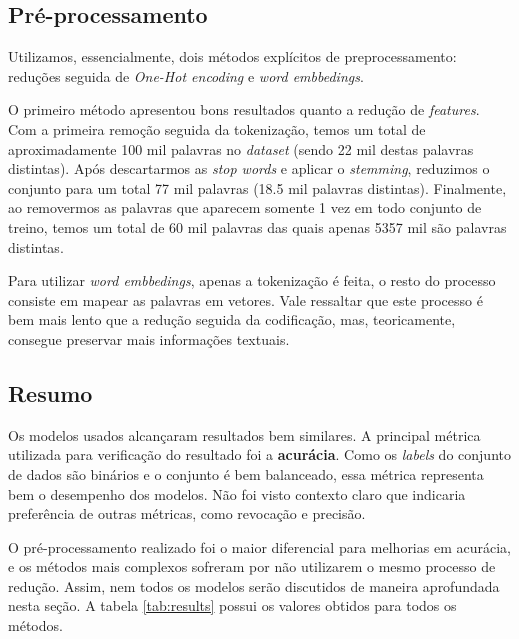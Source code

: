 \documentclass[twoside,conference,a4paper]{IEEEtran}
\begin{document}
\subsection{Pré-processamento} \label{pre-res}

Utilizamos, essencialmente, dois métodos explícitos de preprocessamento: reduções seguida de \textit{One-Hot encoding} e \textit{word embbedings}. 

O primeiro método apresentou bons resultados quanto a redução de \textit{features}. Com a primeira remoção seguida da tokenização, temos um total de aproximadamente 100 mil palavras no \textit{dataset} (sendo 22 mil destas palavras distintas). Após descartarmos as \textit{stop words} e aplicar o \textit{stemming}, reduzimos o conjunto para um total 77 mil palavras (18.5 mil palavras distintas). Finalmente, ao removermos as palavras que aparecem somente 1 vez em todo conjunto de treino, temos um total de 60 mil palavras das quais apenas 5357 mil são palavras distintas.

Para utilizar \textit{word embbedings}, apenas a tokenização é feita, o resto do processo consiste em mapear as palavras em vetores. Vale ressaltar que este processo é bem mais lento que a redução seguida da codificação, mas, teoricamente, consegue preservar mais informações textuais.

\subsection{Resumo}
Os modelos usados alcançaram resultados bem similares. A principal métrica utilizada para verificação do resultado foi a \textbf{acurácia}. Como os \textit{labels} do conjunto de dados são binários e o conjunto é bem balanceado, essa métrica representa bem o desempenho dos modelos. Não foi visto contexto claro que indicaria preferência de outras métricas, como revocação e precisão.

O pré-processamento realizado foi o maior diferencial para melhorias em acurácia, e os métodos mais complexos sofreram por não utilizarem o mesmo processo de redução. Assim, nem todos os modelos serão discutidos de maneira aprofundada nesta seção. A tabela \ref{tab:results} possui os valores obtidos para todos os métodos.
\end{document}
